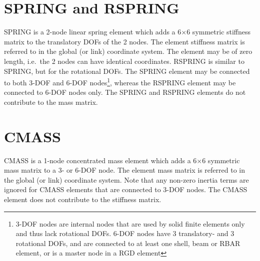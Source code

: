 %
%

%
%

\section{SPRING and RSPRING}
\label{s:SPRING and RSPRING}

SPRING is a 2-node linear spring element which adds a 6$\times$6 symmetric
stiffness matrix to the translatory DOFs of the 2 nodes.
The element stiffness matrix is referred to in the global (or link) coordinate system.
The element may be of zero length, i.e.\ the 2 nodes can have identical coordinates.
RSPRING is similar to SPRING, but for the rotational DOFs.
The SPRING element may be connected to both 3-DOF and 6-DOF nodes\footnote{
3-DOF nodes are internal nodes that are used by solid finite elements only
and thus lack rotational DOFs.
6-DOF nodes have 3 translatory- and 3 rotational DOFs,
and are connected to at least one shell, beam or RBAR element,
or is a master node in a RGD element},
whereas the RSPRING element may be connected to 6-DOF nodes only.
The SPRING and RSPRING elements do not contribute to the mass matrix.

\section{CMASS}
\label{s:CMASS}

CMASS is a 1-node concentrated mass element which adds a 6$\times$6 symmetric
mass matrix to a 3- or 6-DOF node.
The element mass matrix is referred to in the global (or link) coordinate system.
Note that any non-zero inertia terms are ignored for CMASS elements
that are connected to 3-DOF nodes.
The CMASS element does not contribute to the stiffness matrix.

